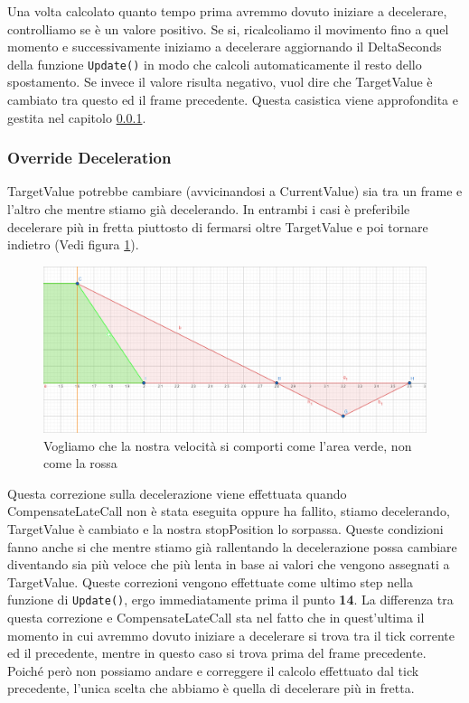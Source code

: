 \documentclass[main.tex]{subfiles}
\begin{document}
Una volta calcolato quanto tempo prima avremmo dovuto iniziare a decelerare, controlliamo se è un valore positivo. Se si, ricalcoliamo il movimento fino a quel momento e successivamente iniziamo a decelerare aggiornando il DeltaSeconds della funzione \lstinline{Update()} in modo che calcoli automaticamente il resto dello spostamento.
Se invece il valore risulta negativo, vuol dire che TargetValue è cambiato tra questo ed il frame precedente. Questa casistica viene approfondita e gestita nel capitolo  \ref{subsubsec:4_2_OverrideDeceleration}.


\subsubsection{Override Deceleration}\label{subsubsec:4_2_OverrideDeceleration}
TargetValue potrebbe cambiare (avvicinandosi a CurrentValue) sia tra un frame e l'altro che mentre stiamo già decelerando. In entrambi i casi è preferibile decelerare più in fretta piuttosto di fermarsi oltre TargetValue e poi tornare indietro (Vedi figura \ref{fig:4_OverrideDecelIntro}).
\begin{figure}[H]
    \centering
    \includegraphics[width=.95\linewidth]{img/interpolazione/OverrideDecelIntro.png}
    \caption{Vogliamo che la nostra velocità si comporti come l'area verde, non come la rossa}
    \label{fig:4_OverrideDecelIntro}
\end{figure}
Questa correzione sulla decelerazione viene effettuata quando CompensateLateCall non è stata eseguita oppure ha fallito, stiamo decelerando, TargetValue è cambiato e la nostra stopPosition lo sorpassa. Queste condizioni fanno anche si che mentre stiamo già rallentando la decelerazione possa cambiare diventando sia più veloce che più lenta in base ai valori che vengono assegnati a TargetValue. Queste correzioni vengono effettuate come ultimo step nella funzione di \lstinline{Update()}, ergo immediatamente prima il punto \textbf{14}.
La differenza tra questa correzione e CompensateLateCall sta nel fatto che in quest'ultima il momento in cui avremmo dovuto iniziare a decelerare si trova tra il tick corrente ed il precedente, mentre in questo caso si trova prima del frame precedente. Poiché però non possiamo andare  e correggere il calcolo effettuato dal tick precedente, l'unica scelta che abbiamo è quella di decelerare più in fretta.\newline
\end{document}
